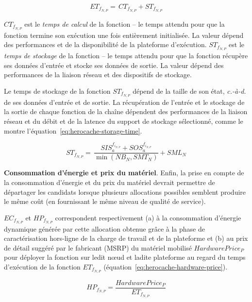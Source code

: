 \begin{equation}
    {ET}_{{f}_{N, P}} = \, {CT}_{{f}_{N, P}} + {ST}_{{f}_{N, P}}
\label{eq:herocache-execution-time}
\end{equation}

${CT}_{{f}_{N, P}}$ est le \textit{temps de calcul} de la fonction -- le temps attendu pour que la fonction termine son exécution une fois entièrement initialisée. La valeur dépend des performances et de la disponibilité de la plateforme d'exécution. ${ST}_{{f}_{N, P}}$ est le \textit{temps de stockage} de la fonction -- le temps attendu pour que la fonction récupère ses données d'entrée et stocke ses données de sortie. La valeur dépend des performances de la liaison réseau et des dispositifs de stockage.

Le temps de stockage de la fonction ${ST}_{{f}_{N, P}}$ dépend de la taille de son état, \textit{c.-à-d.} de ses données d'entrée et de sortie. La récupération de l'entrée et le stockage de la sortie de chaque fonction de la chaîne dépendent des performances de la liaison réseau et du débit et de la latence du support de stockage sélectionné, comme le montre l'équation~\ref{eq:herocache-storage-time}.

\begin{equation}
    {ST}_{{f}_{N, P}} = \, \frac{SIS_{a}^{f_{i_{N, P}}} + SOS_{a}^{f_{i_{N, P}}}}{\min (NB_{N}, SMT_{N})} + SML_{N}
\label{eq:herocache-storage-time}
\end{equation}

\textbf{Consommation d'énergie et prix du matériel}. Enfin, la prise en compte de la consommation d'énergie et du prix du matériel devrait permettre de départager les candidats lorsque plusieurs allocations possibles semblent produire le même coût (en fournissant le même niveau de qualité de service).

${EC}_{{f}_{N, P}}$ et ${HP}_{{f}_{N, P}}$ correspondent respectivement (a) à la consommation d'énergie dynamique générée par cette allocation obtenue grâce à la phase de caractérisation hors-ligne de la charge de travail et de la plateforme et (b) au prix de détail suggéré par le fabricant (MSRP) du matériel mobilisé $Hardware Price_{P}$ pour déployer la fonction sur ledit nœud et ladite plateforme au regard du temps d'exécution de la fonction $ET_{{f}_{N, P}}$ (équation~\ref{eq:herocache-hardware-price}).

\begin{equation}
    {HP}_{{f}_{N, P}} = \frac{Hardware Price_{P}}{ET_{{f}_{N, P}}}
\label{eq:herocache-hardware-price}
\end{equation}

